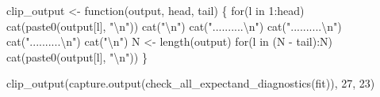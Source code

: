 \documentclass[
  letterpaper,
  DIV=11,
  numbers=noendperiod]{scrartcl}
\newenvironment{Shaded}{\begin{snugshade}}{\end{snugshade}}
\newcommand{\ControlFlowTok}[1]{\textcolor[rgb]{0.00,0.23,0.31}{#1}}
\newcommand{\DecValTok}[1]{\textcolor[rgb]{0.68,0.00,0.00}{#1}}
\newcommand{\FunctionTok}[1]{\textcolor[rgb]{0.28,0.35,0.67}{#1}}
\newcommand{\NormalTok}[1]{\textcolor[rgb]{0.00,0.23,0.31}{#1}}
\newcommand{\OtherTok}[1]{\textcolor[rgb]{0.00,0.23,0.31}{#1}}
\newcommand{\SpecialCharTok}[1]{\textcolor[rgb]{0.37,0.37,0.37}{#1}}
\newcommand{\StringTok}[1]{\textcolor[rgb]{0.13,0.47,0.30}{#1}}
\begin{document}
\begin{Shaded}
\begin{Highlighting}[]
\NormalTok{clip\_output }\OtherTok{\textless{}{-}} \ControlFlowTok{function}\NormalTok{(output, head, tail) \{}
  \ControlFlowTok{for}\NormalTok{(l }\ControlFlowTok{in} \DecValTok{1}\SpecialCharTok{:}\NormalTok{head)}
    \FunctionTok{cat}\NormalTok{(}\FunctionTok{paste0}\NormalTok{(output[l], }\StringTok{"}\SpecialCharTok{\textbackslash{}n}\StringTok{"}\NormalTok{))}
  \FunctionTok{cat}\NormalTok{(}\StringTok{"}\SpecialCharTok{\textbackslash{}n}\StringTok{"}\NormalTok{)}
  \FunctionTok{cat}\NormalTok{(}\StringTok{"..........}\SpecialCharTok{\textbackslash{}n}\StringTok{"}\NormalTok{)}
  \FunctionTok{cat}\NormalTok{(}\StringTok{"..........}\SpecialCharTok{\textbackslash{}n}\StringTok{"}\NormalTok{)}
  \FunctionTok{cat}\NormalTok{(}\StringTok{"..........}\SpecialCharTok{\textbackslash{}n}\StringTok{"}\NormalTok{)}
  \FunctionTok{cat}\NormalTok{(}\StringTok{"}\SpecialCharTok{\textbackslash{}n}\StringTok{"}\NormalTok{)}
\NormalTok{  N }\OtherTok{\textless{}{-}} \FunctionTok{length}\NormalTok{(output)}
  \ControlFlowTok{for}\NormalTok{(l }\ControlFlowTok{in}\NormalTok{ (N }\SpecialCharTok{{-}}\NormalTok{ tail)}\SpecialCharTok{:}\NormalTok{N)}
    \FunctionTok{cat}\NormalTok{(}\FunctionTok{paste0}\NormalTok{(output[l], }\StringTok{"}\SpecialCharTok{\textbackslash{}n}\StringTok{"}\NormalTok{))}
\NormalTok{\}}
\end{Highlighting}
\end{Shaded}

\begin{Shaded}
\begin{Highlighting}[]
\FunctionTok{clip\_output}\NormalTok{(}\FunctionTok{capture.output}\NormalTok{(}\FunctionTok{check\_all\_expectand\_diagnostics}\NormalTok{(fit)), }\DecValTok{27}\NormalTok{, }\DecValTok{23}\NormalTok{)}
\end{Highlighting}
\end{Shaded}
\end{document}
